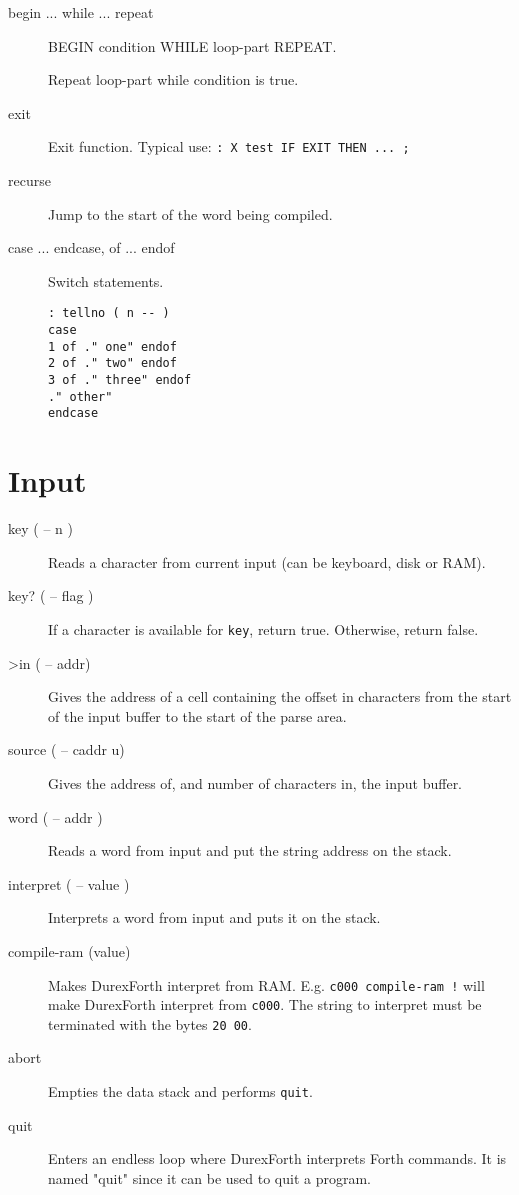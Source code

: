 \begin{description}
\item[begin ... while ... repeat]

BEGIN condition WHILE loop-part REPEAT.

Repeat loop-part while condition is true.

\item[exit]

Exit function. Typical use: \texttt{: X test IF EXIT THEN ... ;}

\item[recurse] Jump to the start of the word being compiled.

\item[case ... endcase, of ... endof] Switch statements.

\begin{verbatim}
: tellno ( n -- )
case
1 of ." one" endof
2 of ." two" endof
3 of ." three" endof
." other"
endcase
\end{verbatim}

\end{description}

\section{Input}

\begin{description}

\item[key ( -- n )] Reads a character from current input (can be keyboard, disk or RAM).
\item[key? ( -- flag )] If a character is available for \texttt{key}, return true. Otherwise, return false.

\item[>in ( -- addr)] Gives the address of a cell containing the offset in characters from the start of the input buffer to the start of the parse area.

\item[source ( -- caddr u)] Gives the address of, and number of characters in, the input buffer.

\item[word ( -- addr )] Reads a word from input and put the string address on the stack.

\item[interpret ( -- value )] Interprets a word from input and puts it on the stack.

\item[compile-ram (value)] Makes DurexForth interpret from RAM.
E.g. \texttt{c000 compile-ram !} will make DurexForth
interpret from \texttt{c000}. The string to interpret
must be terminated with the bytes \texttt{20 00}.

\item[abort] Empties the data stack and performs \texttt{quit}.

\item[quit] Enters an endless loop where DurexForth interprets Forth commands. It is named "quit" since it can be used to quit a program.

\end{description}

